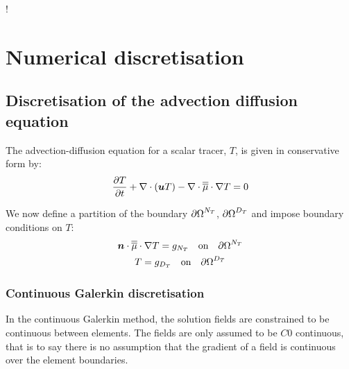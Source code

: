 !\chapter{Numerical discretisation}\label{chap:numerical_discretisation}

\section{Discretisation of the advection diffusion equation}
\label{Sect:ND_advection_diffusion_discretisation}

The advection-diffusion equation for a scalar tracer, $T$,
is given in conservative form by:
\begin{equation}\label{eq:advdif}
  \frac{\partial T}{\partial t} + \nabla\cdot\left({\mbox{\boldmath$u$}} T\right) - \nabla\cdot\overline{\overline{\mu}}\cdot\nabla T = 0
\end{equation}

We now define a partition of the boundary ${\partial\Omega}^{N_T}$,
${\partial\Omega}^{D_T}$ and impose boundary conditions on $T$:
\begin{gather}
  \label{eq:Tboundary}
  {\mbox{\boldmath$n$}}\cdot\overline{\overline{\mu}}\cdot\nabla T=g_{N_T} \quad\textrm{on}\quad {\partial\Omega}^{N_T}\\
  T=g_{D_T} \quad\textrm{on}\quad {\partial\Omega}^{D_T}
\end{gather}


\subsection{Continuous Galerkin discretisation}

In the continuous Galerkin method, the solution fields are constrained to be
continuous between elements. The fields are only assumed to be $C0$
continuous, that is to say there is no assumption that the gradient of a
field is continuous over the element boundaries.

